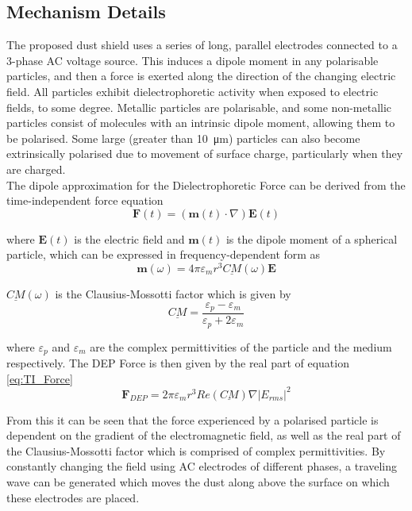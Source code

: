 \documentclass[../main.tex]{subfiles}
\begin{document}
\subsection{Mechanism Details} \label{dust_mech}
The proposed dust shield uses a series of long, parallel electrodes connected to a 3-phase AC voltage source.
This induces a dipole moment in any polarisable particles, and then a force is exerted along the direction of the changing electric field.
All particles exhibit dielectrophoretic activity when exposed to electric fields, to some degree.
Metallic particles are polarisable, and some non-metallic particles consist of molecules with an intrinsic dipole moment, allowing them to be polarised.
Some large (greater than \SI{10}{\micro\metre}) particles can also become extrinsically polarised due to movement of surface charge, particularly when they are charged.\\

The dipole approximation for the Dielectrophoretic Force can be derived \cite{green_dep} from the time-independent force equation
\begin{equation} \label{eq:TI_Force}
\textbf{F}(t) = (\textbf{m}(t)\cdot\nabla)\textbf{E}(t)
\end{equation}

where $\textbf{E}(t)$ is the electric field and $\textbf{m}(t)$ is the dipole moment of a spherical particle, which can be expressed in frequency-dependent form as
\begin{equation}
\textbf{m}(\omega) = 4\pi\varepsilon_{m}r^{3}\underline{CM}(\omega)\textbf{E}
\end{equation}

$\underline{CM}(\omega)$ is the Clausius-Mossotti factor which is given by
\begin{equation}
\underline{CM} = \frac{\varepsilon_{p}-\varepsilon_{m}}{\varepsilon_{p}+2\varepsilon_{m}}
\end{equation}

where $\varepsilon_{p}$ and $\varepsilon_{m}$ are the complex permittivities of the particle and the medium respectively. The DEP Force is then given by the real part of equation \ref{eq:TI_Force}
\begin{equation}
\textbf{F}_{DEP} = 2\pi\varepsilon_{m}r^{3}Re(\underline{CM})\nabla|E_{rms}|^{2}
\end{equation}

From this it can be seen that the force experienced by a polarised particle is dependent on the gradient of the electromagnetic field, as well as the real part of the Clausius-Mossotti factor which is comprised of complex permittivities.
By constantly changing the field using AC electrodes of different phases, a traveling wave can be generated which moves the dust along above the surface on which these electrodes are placed.
\end{document}
